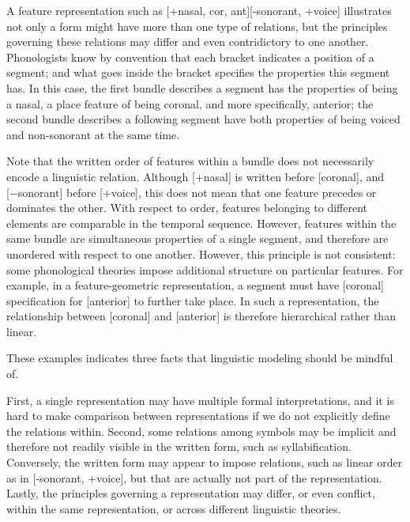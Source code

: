 A feature representation such as [+nasal, cor, ant][-sonorant, +voice] 
illustrates not only a form might have more than one type of relations, 
but the principles governing these relations may differ and even 
contridictory to one another. Phonologists know by 
convention that each bracket indicates a position of a segment; and what 
goes inside the bracket specifies the properties this segment has. In this 
case, the first bundle describes a segment has the properties of being a 
nasal, a place feature of being coronal, and more specifically, anterior; 
the second bundle describes a following segment have both properties of 
being voiced and non-sonorant at the same time. 

Note that the written order of features within a bundle does not necessarily 
encode a linguistic relation. Although [+nasal] is written before [coronal], 
and [−sonorant] before [+voice], this does not mean that one feature precedes 
or dominates the other. With respect to order, features belonging to different 
elements are comparable in the temporal sequence. However, features within the 
same bundle are simultaneous properties of a single segment, and therefore are 
unordered with respect to one another. However, this principle is not 
consistent: some phonological theories impose additional structure on 
particular features. For example, in a feature-geometric representation, a 
segment must have [coronal] specification for [anterior] to further take place. 
In such a representation, the relationship between [coronal] and [anterior] is 
therefore hierarchical rather than linear. 

These examples indicates three facts that linguistic modeling 
should be mindful of.

First, a single representation may have multiple formal interpretations, 
and it is hard to make comparison between representations if we do not
explicitly define the relations within. Second, some relations among 
symbols may be implicit and therefore not readily visible in the written 
form, such as syllabification. Conversely, the written form may appear to impose relations, such as 
linear order as in [-sonorant, +voice], but that are actually not part of 
the representation. Lastly, the principles governing a representation may 
differ, or even conflict, within the same representation, or across different 
linguistic theories.

